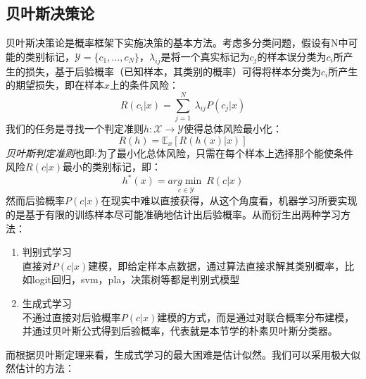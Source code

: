 \documentclass[twoside]{article}
\begin{document}
\subsection*{贝叶斯决策论}
贝叶斯决策论是概率框架下实施决策的基本方法。考虑多分类问题，假设有N中可能的类别标记，$\mathcal{Y}=\{c_1,\ldots,c_N\}$，$\lambda_{ij}$是将一个真实标记为$c_j$的样本误分类为$c_i$所产生的损失，基于后验概率（已知样本，其类别的概率）可得将样本分类为$c_i$所产生的期望损失，即在样本$x$上的条件风险：
\begin{equation*}
    R(c_i|x)=\sum_{j=1}^{N}\ \lambda_{ij}P(c_j|x)
\end{equation*}
我们的任务是寻找一个判定准则$h:\mathcal{X}\longrightarrow \mathcal{Y}$使得总体风险最小化：
\begin{equation*}
    R(h)=\mathbb{E}_{x}\left[R\left(h(x)|x\right)\right]
\end{equation*}
\textit{贝叶斯判定准则}也即:为了最小化总体风险，只需在每个样本上选择那个能使条件风险$R(c|x)$最小的类别标记，即：
\begin{equation*}
    h^*(x)=\underset{c \in \mathcal{Y}}{arg \min}\ R(c|x)
\end{equation*}
然而后验概率$P(c|x)$在现实中难以直接获得，从这个角度看，机器学习所要实现的是基于有限的训练样本尽可能准确地估计出后验概率。从而衍生出两种学习方法：
\begin{enumerate}
    \item 判别式学习
    \\直接对$P(c|x)$建模，即给定样本点数据，通过算法直接求解其类别概率，比如logit回归，svm，pla，决策树等都是判别式模型
    \item 生成式学习\\
    不通过直接对后验概率$P(c|x)$建模的方式，而是通过对联合概率分布建模，并通过贝叶斯公式得到后验概率，代表就是本节学的朴素贝叶斯分类器。
\end{enumerate}
而根据贝叶斯定理来看，生成式学习的最大困难是估计似然。我们可以采用极大似然估计的方法：
\end{document}
